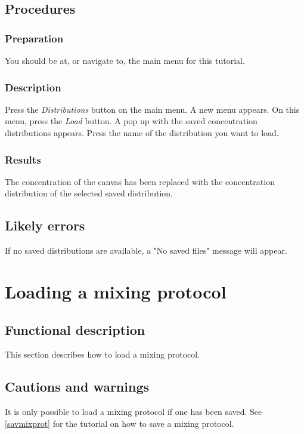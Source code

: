 \subsection{Procedures}
\subsubsection{Preparation}
You should be at, or navigate to, the main menu for this tutorial.

\subsubsection{Description}
Press the \emph{Distributions} button on the main menu. A new menu appears. On this menu, press the \emph{Load} button. A pop up with the saved concentration distributions appears. Press the name of the distribution you want to load.

\subsubsection{Results}
The concentration of the canvas has been replaced with the concentration distribution of the selected saved distribution.

\subsection{Likely errors}
If no saved distributions are available, a "No saved files" message will appear. 


\section{Loading a mixing protocol}
\label{sec:loadMixProt}

\subsection{Functional description}
This section describes how to load a mixing protocol.

\subsection{Cautions and warnings}
It is only possible to load a mixing protocol if one has been saved. See \ref{savmixprot} for the tutorial on how to save a mixing protocol.


